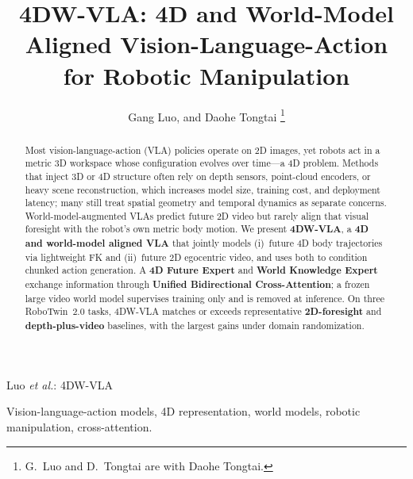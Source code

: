 \documentclass[journal]{IEEEtran}
\begin{document}
\title{4DW-VLA: 4D and World-Model Aligned Vision-Language-Action for Robotic Manipulation}

\author{Gang Luo, 
        and Daohe Tongtai%
\thanks{G.~Luo and D.~Tongtai are with Daohe Tongtai.}%
}

%
{Luo \MakeLowercase{\textit{et al.}}: 4DW-VLA}

\maketitle

\begin{abstract}
Most vision-language-action (VLA) policies operate on 2D images, yet robots act in a metric 3D workspace whose configuration evolves over time---a 4D problem. Methods that inject 3D or 4D structure often rely on depth sensors, point-cloud encoders, or heavy scene reconstruction, which increases model size, training cost, and deployment latency; many still treat spatial geometry and temporal dynamics as separate concerns. World-model-augmented VLAs predict future 2D video but rarely align that visual foresight with the robot's own metric body motion. We present \textbf{4DW-VLA}, a \textbf{4D and world-model aligned VLA} that jointly models (i)~future 4D body trajectories via lightweight FK and (ii)~future 2D egocentric video, and uses both to condition chunked action generation. A \textbf{4D Future Expert} and \textbf{World Knowledge Expert} exchange information through \textbf{Unified Bidirectional Cross-Attention}; a frozen large video world model supervises training only and is removed at inference. On three RoboTwin~2.0 tasks, 4DW-VLA matches or exceeds representative \textbf{2D-foresight} and \textbf{depth-plus-video} baselines, with the largest gains under domain randomization.
\end{abstract}

\begin{IEEEkeywords}
Vision-language-action models, 4D representation, world models, robotic manipulation, cross-attention.
\end{IEEEkeywords}





\end{document}
